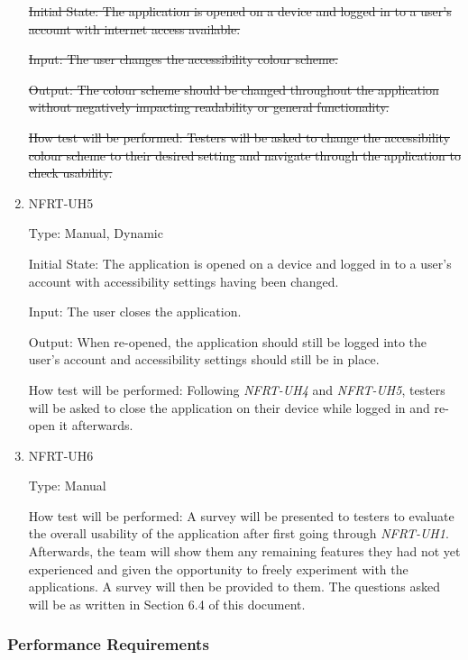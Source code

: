 \documentclass[12pt, titlepage]{article}
\begin{document}
\begin{enumerate}
  \sout{Initial State: The application is opened on a device and logged in to a user's account with internet access available.}
					
  \sout{Input: The user changes the accessibility colour scheme.}
					
  \sout{Output: The colour scheme should be changed throughout the application without negatively impacting readability
  or general functionality.}
  
  \sout{How test will be performed: Testers will be asked to change the accessibility colour scheme to their desired setting and
  navigate through the application to check usability.}

  \item{NFRT-UH5\\}

  Type: Manual, Dynamic
					
  Initial State: The application is opened on a device and logged in to a user's account with accessibility settings
  having been changed.
					
  Input: The user closes the application.
					
  Output: When re-opened, the application should still be logged into the user's account and accessibility
  settings should still be in place.
  
  How test will be performed: Following \textit{NFRT-UH4} and \textit{NFRT-UH5}, testers will be asked to
  close the application on their device while logged in and re-open it afterwards.

  \item{NFRT-UH6\\}

  Type: Manual

  How test will be performed: A survey will be presented to testers to evaluate the overall usability of the
  application after first going through \textit{NFRT-UH1}. Afterwards, the team will show them any remaining features
  they had not yet experienced and given the opportunity to freely experiment with the applications. A survey will then be
  provided to them. The questions asked will be as written in Section 6.4 of this document.
\end{enumerate}

\subsubsection{Performance Requirements}
\end{document}
